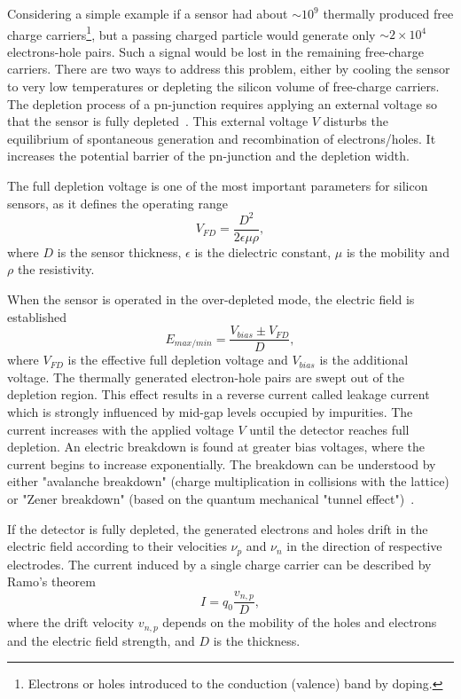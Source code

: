 Considering a simple example if a sensor had about $\sim10^{9}$ thermally produced free charge carriers\footnote{Electrons or holes introduced to the conduction (valence) band by doping.}, but a passing charged particle would generate only $\sim2\times10^{4}$ electrons-hole pairs. Such a signal would be lost in the remaining free-charge carriers. There are two ways to address this problem, either by cooling the sensor to very low temperatures or depleting the silicon volume of free-charge carriers. The depletion process of a pn-junction requires applying an external voltage so that the sensor is fully depleted~\cite{Spieler}. This external voltage $V$ disturbs the equilibrium of spontaneous generation and recombination of electrons/holes. It increases the potential barrier of the pn-junction and the depletion width. 

The full depletion voltage is one of the most important parameters for silicon sensors, as it defines the operating range
\begin{equation}
    V_{FD} = \frac{D^{2}}{2\epsilon \mu \rho},
\end{equation}
where $D$ is the sensor thickness, $\epsilon$ is the dielectric constant, $\mu$ is the mobility and $\rho$ the resistivity.

When the sensor is operated in the over-depleted mode, the electric field is established
\begin{equation}
    E_{max/min} = \frac{V_{bias}\pm V_{FD}}{D},
\end{equation}
where $V_{FD}$ is the effective full depletion voltage and $V_{bias}$ is the additional voltage. The thermally generated electron-hole pairs are swept out of the depletion region. This effect results in a reverse current called leakage current which is strongly influenced by mid-gap levels occupied by impurities. The current increases with the applied voltage ${V}$ until the detector reaches full depletion. An electric breakdown is found at greater bias voltages, where the current begins to increase exponentially. The breakdown can be understood by either "avalanche breakdown" (charge multiplication in collisions with the lattice) or "Zener breakdown" (based on the quantum mechanical "tunnel effect")~\cite{Hartmann:2017gzy}.

If the detector is fully depleted, the generated electrons and holes drift in the electric field according to their velocities $\nu_{p}$ and $\nu_{n}$ in the direction of respective electrodes. The current induced by a single charge carrier can be described by Ramo's theorem
\begin{equation}
    I = q_{0}\frac{v_{n,p}}{D},
\end{equation}
where the drift velocity $v_{n,p}$ depends on the mobility of the holes and electrons and the electric field strength, and $D$ is the thickness.

